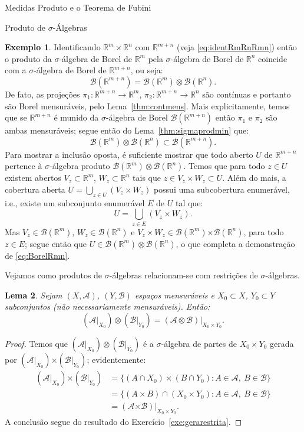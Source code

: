 \documentclass[oneside,final,11pt]{amsbook}
\newcommand{\R}{\mathds R}
\newcommand{\Times}{\pmb{\times}}
\newcommand{\Borel}{\mathcal B}
\theoremstyle{remark}\newtheorem{exercise}{Exercício}[chapter]
\theoremstyle{remark}\newtheorem{*exercise}[exercise]{\hbox to 0pt{\hskip 0pt minus 1fil*}Exercício}
\theoremstyle{definition}\newtheorem{exdefin}{Definição}[chapter]
\theoremstyle{plain}\newtheorem{teo}{Teorema}[section]
\theoremstyle{plain}\newtheorem{lem}[teo]{Lema}
\theoremstyle{plain}\newtheorem{prop}[teo]{Proposição}
\theoremstyle{plain}\newtheorem{cor}[teo]{Corolário}
\theoremstyle{definition}\newtheorem{defin}[teo]{Definição}
\theoremstyle{remark}\newtheorem{rem}[teo]{Observação}
\theoremstyle{definition}\newtheorem{notation}[teo]{Notação}
\theoremstyle{definition}\newtheorem{convention}[teo]{Convenção}
\theoremstyle{definition}\newtheorem{example}[teo]{Exemplo}
\numberwithin{section}{chapter}
\numberwithin{equation}{section}
\begin{document}
\begin{chapter}{Medidas Produto e o Teorema de Fubini}
\begin{section}{Produto de ${\sigma}$-Álgebras}
\begin{example}\label{exa:prodBorelRn}
Identificando $\R^m\times\R^n$ com $\R^{m+n}$ (veja \eqref{eq:identRmRnRmn}) então o produto da $\sigma$-álgebra de Borel de
$\R^m$ pela $\sigma$-álgebra de Borel de $\R^n$ coincide com a $\sigma$-álgebra de Borel
de $\R^{m+n}$, ou seja:
\begin{equation}\label{eq:BorelRmn}
\Borel(\R^{m+n})=\Borel(\R^m)\otimes\Borel(\R^n).
\end{equation}
De fato, as projeções $\pi_1:\R^{m+n}\to\R^m$, $\pi_2:\R^{m+n}\to\R^n$ são
contínuas e portanto são Borel mensuráveis, pelo Lema~\ref{thm:contmens}. Mais
explicitamente, temos que se $\R^{m+n}$ é munido da $\sigma$-álgebra de Borel
$\Borel(\R^{m+n})$ então $\pi_1$ e $\pi_2$ são ambas mensuráveis;
segue então do Lema~\ref{thm:sigmaprodmin} que:
\[\Borel(\R^m)\otimes\Borel(\R^n)\subset\Borel(\R^{m+n}).\]
Para mostrar a inclusão oposta, é suficiente mostrar que todo aberto $U$ de $\R^{m+n}$
pertence à $\sigma$-álgebra produto $\Borel(\R^m)\otimes\Borel(\R^n)$. Temos que para todo $z\in U$
existem abertos $V_z\subset\R^m$, $W_z\subset\R^n$ tais que $z\in V_z\times W_z\subset U$.
Além do mais, a cobertura aberta $U=\bigcup_{z\in U}(V_z\times W_z)$ possui uma subcobertura
enumerável, i.e., existe um subconjunto enumerável $E$ de $U$ tal que:
\[U=\bigcup_{z\in E}(V_z\times W_z).\]
Mas $V_z\in\Borel(\R^m)$, $W_z\in\Borel(\R^n)$
e $V_z\times W_z\in\Borel(\R^m)\Times\Borel(\R^n)$, para todo $z\in E$; segue então
que $U\in\Borel(\R^m)\otimes\Borel(\R^n)$, o que completa a demonstração de \eqref{eq:BorelRmn}.
\end{example}

Vejamos como produtos de $\sigma$-álgebras relacionam-se com restrições de $\sigma$-álgebras.
\begin{lem}\label{thm:lemarestrprod}
Sejam $(X,\mathcal A)$, $(Y,\mathcal B)$ espaços mensuráveis e $X_0\subset X$,
$Y_0\subset Y$ subconjuntos (não necessariamente mensuráveis). Então:
\[(\mathcal A\vert_{X_0})\otimes(\mathcal B\vert_{Y_0})=(\mathcal A\otimes\mathcal B)\vert_{X_0\times Y_0}.\]
\end{lem}
\begin{proof}
Temos que $(\mathcal A\vert_{X_0})\otimes(\mathcal B\vert_{Y_0})$ é a $\sigma$-álgebra
de partes de $X_0\times Y_0$ gerada por $(\mathcal A\vert_{X_0})\Times(\mathcal B\vert_{Y_0})$;
evidentemente:
\begin{align*}
(\mathcal A\vert_{X_0})\Times(\mathcal B\vert_{Y_0})&=
\big\{(A\cap X_0)\times(B\cap Y_0):A\in\mathcal A,\ B\in\mathcal B\big\}\\
&=\big\{(A\times B)\cap(X_0\times Y_0):A\in\mathcal A,\ B\in\mathcal B\big\}\\
&=(\mathcal A\Times\mathcal B)\vert_{X_0\times Y_0}.
\end{align*}
A conclusão segue do resultado do Exercício~\ref{exe:gerarestrita}.
\end{proof}


\end{section}
\end{chapter}
\end{document}
